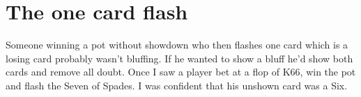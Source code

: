 \section{The one card flash}

Someone winning a pot without showdown who then flashes one card
which is a losing card probably wasn't bluffing. If he wanted to
show a bluff he'd show both cards and remove all doubt. Once
I saw a player bet at a flop of K66, win the pot and flash the
Seven of Spades. I was confident that his unshown card was a
Six.








